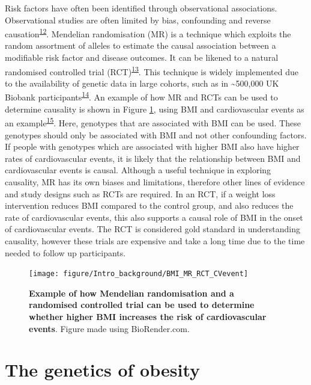 \documentclass[11pt,twoside]{bristolthesis}
\begin{document}
Risk factors have often been identified through observational associations. Observational studies are often limited by bias, confounding and reverse causation\textsuperscript{\protect\hyperlink{ref-Davies2018}{12}}. Mendelian randomisation (MR) is a technique which exploits the random assortment of alleles to estimate the causal association between a modifiable risk factor and disease outcomes. It can be likened to a natural randomised controlled trial (RCT)\textsuperscript{\protect\hyperlink{ref-Gill2020}{13}}. This technique is widely implemented due to the availability of genetic data in large cohorts, such as in \textasciitilde500,000 UK Biobank participants\textsuperscript{\protect\hyperlink{ref-Bycroft2018}{14}}. An example of how MR and RCTs can be used to determine causality is shown in Figure \ref{fig:MR-CVevent}, using BMI and cardiovascular events as an example\textsuperscript{\protect\hyperlink{ref-Doney2009}{15}}. Here, genotypes that are associated with BMI can be used. These genotypes should only be associated with BMI and not other confounding factors. If people with genotypes which are associated with higher BMI also have higher rates of cardiovascular events, it is likely that the relationship between BMI and cardiovascular events is causal. Although a useful technique in exploring causality, MR has its own biases and limitations, therefore other lines of evidence and study designs such as RCTs are required. In an RCT, if a weight loss intervention reduces BMI compared to the control group, and also reduces the rate of cardiovascular events, this also supports a causal role of BMI in the onset of cardiovascular events. The RCT is considered gold standard in understanding causality, however these trials are expensive and take a long time due to the time needed to follow up participants.




\begin{figure}

{\centering \texttt{[image: figure/Intro\_background/BMI\_MR\_RCT\_CVevent]} 

}

\caption[Mendelian randomisation and randomised controlled trial example using body mass index and cardiovascular events]{\textbf{Example of how Mendelian randomisation and a randomised controlled trial can be used to determine whether higher BMI increases the risk of cardiovascular events}. Figure made using BioRender.com.}\label{fig:MR-CVevent}
\end{figure}
\hypertarget{the-genetics-of-obesity}{%
\section{The genetics of obesity}\label{the-genetics-of-obesity}}
\end{document}
